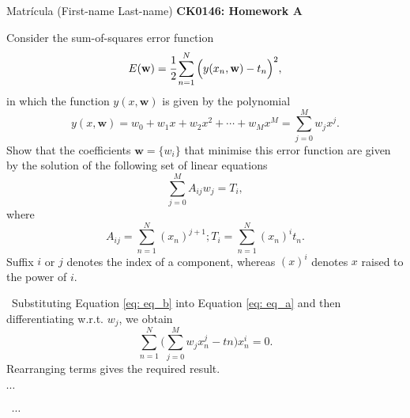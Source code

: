 \documentclass[11pt]{article}
\newenvironment{EX}[2][Exercise]{\begin{trivlist}
\item[{\color{red} \hskip \labelsep {\bfseries #1}\hskip \labelsep {\bfseries #2.}}]}{\end{trivlist}}
\newenvironment{SL}[1][Solution]{\begin{trivlist}
\item[{\color{blue} \hskip \labelsep {\bfseries #1:}}]}{\end{trivlist}}
\begin{document}

\noindent Matr\'icula (First-name Last-name) \hfill {\Large \bfseries CK0146: Homework A} \\

\begin{EX}{A.1}
Consider the sum-of-squares error function
\begin{equation}
E(\mathbf{w}) = \cfrac{1}{2}\sum_{n=1}^{N}{\Big(y(x_n,\mathbf{w}) - t_n\Big)^2}, \label{eq: eq_a}
\end{equation}
in which the function $y(x,\mathbf{w})$ is given by the polynomial
\begin{equation}
y(x,\mathbf{w}) = w_0 + w_1x + w_2x^2 + \cdots + w_Mx^M = \sum_{j=0}^{M}{w_jx^j}. \label{eq: eq_b}
\end{equation}
Show that the coefficients $\mathbf{w} = \{w_i\}$ that minimise this error function are given by the solution of the following set of linear equations
\begin{equation}
\sum_{j=0}^{M}{A_{ij}w_j} = T_i, \label{eq: eq_c}
\end{equation}  
where 
\begin{subequations}
\begin{equation}
A_{ij} = \sum_{n=1}^{N}{(x_n)^{j+1}}; \label{eq: eq_ca}
\end{equation}
\begin{equation}
T_i = \sum_{n=1}^{N}{(x_n)^it_n}. \label{eq: eq_cb}
\end{equation}
\end{subequations}
Suffix $i$ or $j$ denotes the index of a component, whereas $(x)^i$ denotes $x$ raised to the power of $i$.
\end{EX}

\begin{SL}\
Substituting Equation \ref{eq: eq_b} into Equation \ref{eq: eq_a} and then differentiating w.r.t. $w_j$, we obtain $$\sum_{n=1}^{N}{\Big(\sum_{j=0}^{M}{w_jx_n^j - tn}\Big)x_n^i} = 0.$$ Rearranging terms gives the required result.
\end{SL}


\begin{EX}{A.2}
$\cdots$
\end{EX}

\begin{SL}\
$\cdots$
\end{SL}

\end{document}
